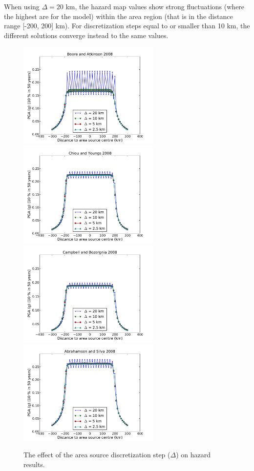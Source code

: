 When using $\Delta=20$ km, the hazard map values show strong fluctuations (where
the highest are for the \cite{boore2008} model) within the area region (that is
in the distance range [-200, 200] km). For discretization steps equal to or
smaller than 10 km, the different solutions converge instead to the same
values.
\begin{figure}
\centering
\includegraphics[width=7cm]{./Pictures/PGA_0pt1_source_model_a5_BA2008.pdf}
\includegraphics[width=7cm]{./Pictures/PGA_0pt1_source_model_a5_CY2008.pdf}
\includegraphics[width=7cm]{./Pictures/PGA_0pt1_source_model_a5_CB2008.pdf}
\includegraphics[width=7cm]{./Pictures/PGA_0pt1_source_model_a5_AS2008.pdf}
\caption{The effect of the area source discretization step ($\Delta$) on 
hazard results.}
\label{fig:delta_area}
\end{figure}

